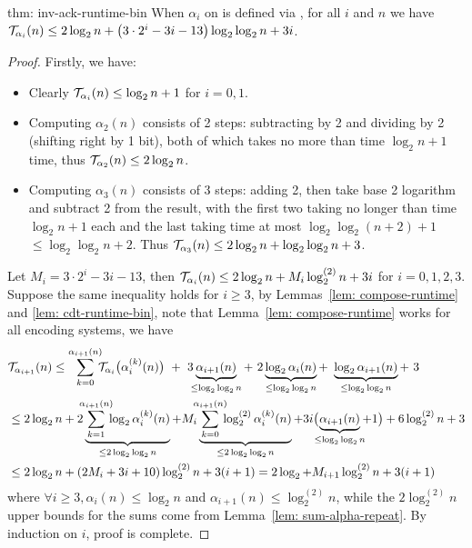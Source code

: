 \begin{usethmcounterof}{thm: inv-ack-runtime-bin}
	When $\alpha_i$ on  is defined via , for all $i$ and $n$ we have $\mathcal{T}_{\alpha_i}(n) \le 2\log_2n + \left(3\cdot 2^i - 3i - 13\right)\log_2\log_2n + 3i$.
\end{usethmcounterof}

\begin{proof}
	Firstly, we have:
	\begin{itemize}
		\item Clearly $\mathcal{T}_{\alpha_i}(n)\le \log_2n + 1$ for $i = 0, 1$.
		\item Computing $\alpha_2(n)$ consists of 2 steps: subtracting by 2 and dividing by 2 (shifting right by 1 bit), both of which takes no more than time $\log_2n + 1$ time, thus $\mathcal{T}_{\alpha_2}(n)\le 2\log_2n$.
		\item Computing $\alpha_3(n)$ consists of 3 steps: adding 2, then take base 2 logarithm and subtract 2 from the result, with the first two taking no longer than time $\log_2n + 1$ each and the last taking time at most $\log_2\log_2(n+2) + 1$ $\le \log_2\log_2 n + 2$. Thus $\mathcal{T}_{\alpha_3}(n)\le 2\log_2n + \log_2\log_2n + 3$.
	\end{itemize}
  Let $M_i = 3\cdot 2^i - 3i - 13$, then $\mathcal{T}_{\alpha_i}(n)\le 2\log_2n + M_i\log_2^{(2)}n + 3i$ for $i = 0, 1, 2, 3$.
	Suppose the same inequality holds for $i\ge 3$, by Lemmas~\ref{lem: compose-runtime} and \ref{lem: cdt-runtime-bin}, note that Lemma~\ref{lem: compose-runtime} works for all encoding systems, we have
	\begin{equation*}
	\begin{aligned}
	& \runtime_{\alpha_{i+1}}(n) \le
	\sum_{k=0}^{\alpha_{i+1}(n)} \hspace{-5pt} \runtime_{\alpha_i}\big(\alpha_i^{(k)}(n)\big)
	\ + \ 3\hspace{-4pt}\underbrace{\alpha_{i+1}(n)}_{\le \log_2\log_2n}
	+ \ 2\underbrace{\log_2\alpha_i(n)}_{\le \log_2\log_2n}
	+ \ \underbrace{\log_2\alpha_{i+1}(n)}_{\le \log_2\log_2n} + \ 3 \\
	& \le 2\log_2n
	+ 2\underbrace{\hspace{-5pt}\sum_{k=1}^{\alpha_{i+1}(n)}\hspace{-5pt} \log_2\alpha_i^{(k)}(n)}_{\le 2\log_2\log_2n}
	+ M_i\underbrace{\hspace{-5pt}\sum_{k=0}^{\alpha_{i+1}(n)}\hspace{-5pt} \log_2^{(2)}\alpha_i^{(k)}(n)}_{\le 2\log_2\log_2n}
	+ 3i\big(\hspace{-5.5pt}\underbrace{\alpha_{i+1}(n)}_{\le \log_2\log_2n}\hspace{-4pt} + 1\big) + 6\log_2^{(2)}n + 3 \\
	& \le 2\log_2n + (2M_i + 3i + 10)\log_2^{(2)}n + 3(i + 1)
	= 2\log_2 + M_{i+1}\log_2^{(2)}n + 3(i + 1)
	\end{aligned}
	\end{equation*}
	where $\forall i\ge 3, \alpha_i(n)\le \log_2n$ and $\alpha_{i+1}(n)\le \log_2^{(2)}n$, while the $2\log_2^{(2)}n$ upper bounds for the sums come from Lemma~\ref{lem: sum-alpha-repeat}.
	By induction on $i$, proof is complete.
\end{proof}
